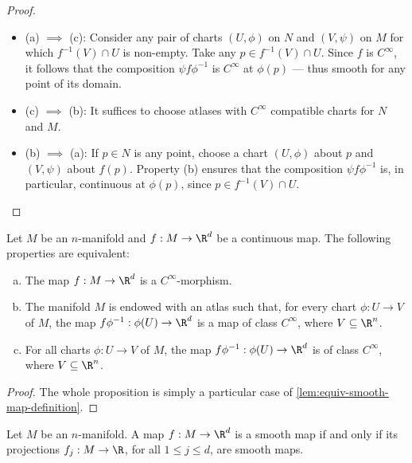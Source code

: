 \begin{proof}
\begin{itemize}\setlength\itemsep{0em}
\item (a) \(\implies\) (c): Consider any pair of charts \((U, \phi)\) on \(N\)
  and \((V, \psi)\) on \(M\) for which \(f^{-1}(V) \cap U\) is non-empty. Take
  any \(p \in f^{-1}(V) \cap U\). Since \(f\) is \(C^{\infty}\), it follows that
  the composition \(\psi f \phi^{-1}\) is \(C^{\infty}\) at \(\phi(p)\) --- thus
  smooth for any point of its domain.

\item (c) \(\implies\) (b): It suffices to choose atlases with \(C^{\infty}\)
  compatible charts for \(N\) and \(M\).

\item (b) \(\implies\) (a): If \(p \in N\) is any point, choose a chart \((U,
  \phi)\) about \(p\) and \((V, \psi)\) about \(f(p)\). Property (b) ensures
  that the composition \(\psi f \phi^{-1}\) is, in particular, continuous at
  \(\phi(p)\), since \(p \in f^{-1}(V) \cap U\).
\end{itemize}
\end{proof}

\begin{corollary}
\label{cor:equiv-smooth-vec-val-map}
Let \(M\) be an \(n\)-manifold and \(f: M \to \R^d\) be a continuous map. The
following properties are equivalent:
\begin{enumerate}[(a)]\setlength\itemsep{0em}
\item The map \(f: M \to \R^d\) is a \(C^{\infty}\)-morphism.

\item The manifold \(M\) is endowed with an atlas such that, for every chart
  \(\phi: U \to V\) of \(M\), the map \(f \phi^{-1}: \phi(U) \to \R^d\) is a map
  of class \(C^{\infty}\), where \(V \subseteq \R^n\).

\item For all charts \(\phi: U \to V\) of \(M\), the map \(f \phi^{-1}: \phi(U)
  \to \R^d\) is of class \(C^{\infty}\), where \(V \subseteq \R^n\).
\end{enumerate}
\end{corollary}

\begin{proof}
The whole proposition is simply a particular case of
\cref{lem:equiv-smooth-map-definition}.
\end{proof}

\begin{proposition}
\label{prop:smoothness-from-components}
Let \(M\) be an \(n\)-manifold. A map \(f: M \to \R^d\) is a smooth map if and
only if its projections \(f_j: M \to \R\), for all \(1 \leq j \leq d\), are
smooth maps.
\end{proposition}

